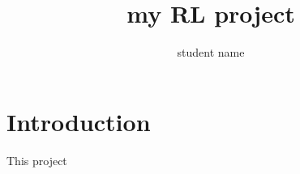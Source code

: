 \documentclass[onecolumn,letterpaper,12pt]{article}
\title{my RL project }
\author{student name}
\date{}
\begin{document}
\maketitle

\section{Introduction}


This project



%
%
\end{document}

